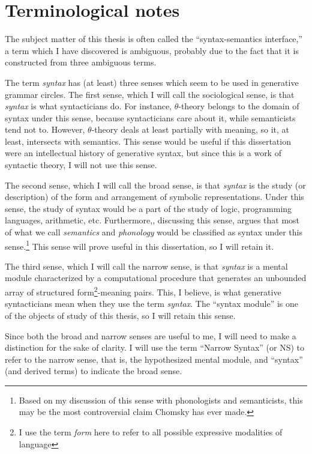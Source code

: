 \documentclass[MilwayThesis]{subfiles}
\begin{document}
\section{Terminological notes}
The subject matter of this thesis is often called the ``syntax-semantics interface,'' a term which I have discovered is ambiguous, probably due to the fact that it is constructed from three ambiguous terms.

The term \textit{syntax} has (at least) three senses which seem to be used in generative grammar circles.
The first sense, which I will call the sociological sense, is that \textit{syntax} is what syntacticians do.
For instance, $\theta$-theory belongs to the domain of syntax under this sense, because syntacticians care about it, while semanticists tend not to.
However, $\theta$-theory deals at least partially with meaning, so it, at least, intersects with semantics.
This sense would be useful if this dissertation were an intellectual history of generative syntax, but since this is a work of syntactic theory, I will not use this sense.

The second sense, which I will call the broad sense, is that \textit{syntax} is the study (or description) of the form and arrangement of symbolic representations.
Under this sense, the study of syntax would be a part of the study of logic, programming languages, arithmetic, etc.
Furthermore,\textcite[174]{chomsky2000new}, discussing this sense, argues that most of what we call \textit{semantics} and \textit{phonology} would be classified as syntax under this sense.\footnote{Based on my discussion of this sense with phonologists and semanticists, this may be the most controversial claim Chomsky has ever made.}
This sense will prove useful in this dissertation, so I will retain it.

The third sense, which I will call the narrow sense, is that \textit{syntax} is a mental module characterized by a computational procedure that generates an unbounded array of structured form\footnote{I use the term \textit{form} here to refer to all possible expressive modalities of language}-meaning pairs.
This, I believe, is what generative syntacticians mean when they use the term \textit{syntax}.
The ``syntax module'' is one of the objects of study of this thesis, so I will retain this sense.

Since both the broad and narrow senses are useful to me, I will need to make a distinction for the sake of clarity.
I will use the term ``Narrow Syntax'' (or NS) to refer to the narrow sense, that is, the hypothesized mental module, and ``syntax'' (and derived terms) to indicate the broad sense.
\end{document}
